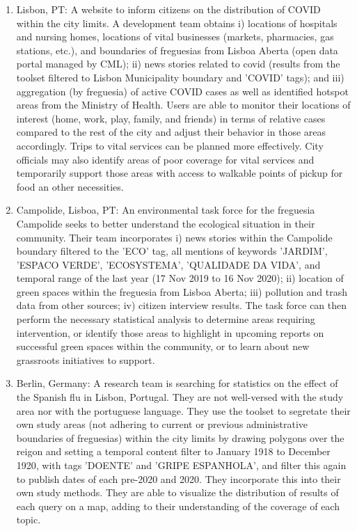 \documentclass[11pt,usenames,dvipsnames]{article} %
\begin{document}
\begin{enumerate}
	\item Lisbon, PT: A website to inform citizens on the distribution of COVID within the city limits. A development team obtains i) locations of hospitals and nursing homes, locations of vital businesses (markets, pharmacies, gas stations, etc.), and boundaries of freguesias from Lisboa Aberta (open data portal managed by CML); ii) news stories related to covid (results from the toolset filtered to Lisbon Municipality boundary and 'COVID' tags); and iii) aggregation (by freguesia) of active COVID cases as well as identified hotspot areas from the Ministry of Health.  Users are able to monitor their locations of interest (home, work, play, family, and friends) in terms of relative cases compared to the rest of the city and adjust their behavior in those areas accordingly.  Trips to vital services can be planned more effectively. City officials may also identify areas of poor coverage for vital services and temporarily support those areas with access to walkable points of pickup for food an other necessities.
	\item Campolide, Lisboa, PT: An environmental task force for the freguesia Campolide seeks to better understand the ecological situation in their community.  Their team incorporates i) news stories within the Campolide boundary filtered to the 'ECO' tag, all mentions of keywords 'JARDIM', 'ESPACO VERDE', 'ECOSYSTEMA', 'QUALIDADE DA VIDA', and temporal range of the last year (17 Nov 2019 to 16 Nov 2020); ii) location of green spaces within the freguesia from Lisboa Aberta; iii) pollution and trash data from other sources; iv) citizen interview results. The task force can then perform the necessary statistical analysis to determine areas requiring intervention, or identify those areas to highlight in upcoming reports on successful green spaces within the community, or to learn about new grassroots initiatives to support.
	\item Berlin, Germany: A research team is searching for statistics on the effect of the Spanish flu in Lisbon, Portugal.  They are not well-versed with the study area nor with the portuguese language.  They use the toolset to segretate their own study areas (not adhering to current or previous administrative boundaries of freguesias) within the city limits by drawing polygons over the reigon and setting a temporal content filter to January 1918 to December 1920, with tags 'DOENTE' and 'GRIPE ESPANHOLA', and filter this again to publish dates of each pre-2020 and 2020.  They incorporate this into their own study methods.  They are able to visualize the distribution of results of each query on a map, adding to their understanding of the coverage of each topic.
\end{enumerate}
\end{document}
